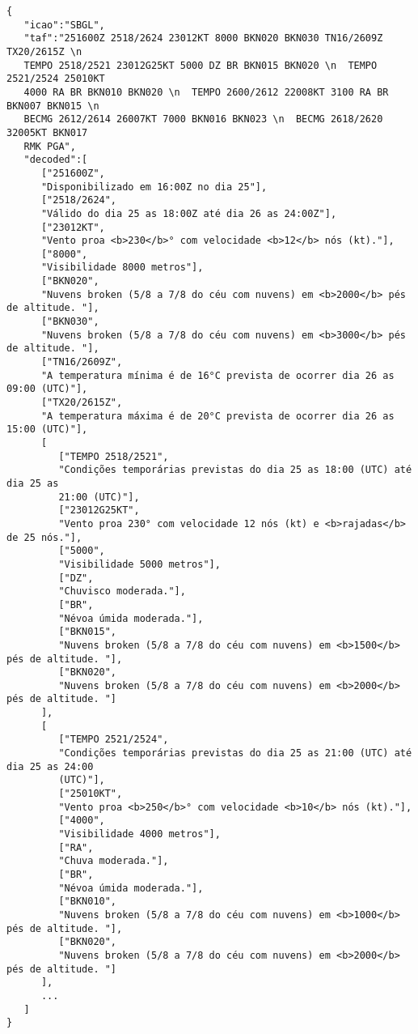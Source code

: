 \begin{smaller}
\begin{verbatim}
{
   "icao":"SBGL",
   "taf":"251600Z 2518/2624 23012KT 8000 BKN020 BKN030 TN16/2609Z TX20/2615Z \n  
   TEMPO 2518/2521 23012G25KT 5000 DZ BR BKN015 BKN020 \n  TEMPO 2521/2524 25010KT 
   4000 RA BR BKN010 BKN020 \n  TEMPO 2600/2612 22008KT 3100 RA BR BKN007 BKN015 \n  
   BECMG 2612/2614 26007KT 7000 BKN016 BKN023 \n  BECMG 2618/2620 32005KT BKN017 
   RMK PGA",
   "decoded":[
      ["251600Z",
      "Disponibilizado em 16:00Z no dia 25"],
      ["2518/2624",
      "Válido do dia 25 as 18:00Z até dia 26 as 24:00Z"],
      ["23012KT",
      "Vento proa <b>230</b>° com velocidade <b>12</b> nós (kt)."],
      ["8000",
      "Visibilidade 8000 metros"],
      ["BKN020",
      "Nuvens broken (5/8 a 7/8 do céu com nuvens) em <b>2000</b> pés de altitude. "],
      ["BKN030",
      "Nuvens broken (5/8 a 7/8 do céu com nuvens) em <b>3000</b> pés de altitude. "],
      ["TN16/2609Z",
      "A temperatura mínima é de 16°C prevista de ocorrer dia 26 as 09:00 (UTC)"],
      ["TX20/2615Z",
      "A temperatura máxima é de 20°C prevista de ocorrer dia 26 as 15:00 (UTC)"],
      [
         ["TEMPO 2518/2521",
         "Condições temporárias previstas do dia 25 as 18:00 (UTC) até dia 25 as 
         21:00 (UTC)"],
         ["23012G25KT",
         "Vento proa 230° com velocidade 12 nós (kt) e <b>rajadas</b> de 25 nós."],
         ["5000",
         "Visibilidade 5000 metros"],
         ["DZ",
         "Chuvisco moderada."],
         ["BR",
         "Névoa úmida moderada."],
         ["BKN015",
         "Nuvens broken (5/8 a 7/8 do céu com nuvens) em <b>1500</b> pés de altitude. "],
         ["BKN020",
         "Nuvens broken (5/8 a 7/8 do céu com nuvens) em <b>2000</b> pés de altitude. "]
      ],
      [
         ["TEMPO 2521/2524",
         "Condições temporárias previstas do dia 25 as 21:00 (UTC) até dia 25 as 24:00 
         (UTC)"],
         ["25010KT",
         "Vento proa <b>250</b>° com velocidade <b>10</b> nós (kt)."],
         ["4000",
         "Visibilidade 4000 metros"],
         ["RA",
         "Chuva moderada."],
         ["BR",
         "Névoa úmida moderada."],
         ["BKN010",
         "Nuvens broken (5/8 a 7/8 do céu com nuvens) em <b>1000</b> pés de altitude. "],
         ["BKN020",
         "Nuvens broken (5/8 a 7/8 do céu com nuvens) em <b>2000</b> pés de altitude. "]
      ],
      ...
   ]
}
\end{verbatim}
\end{smaller}

